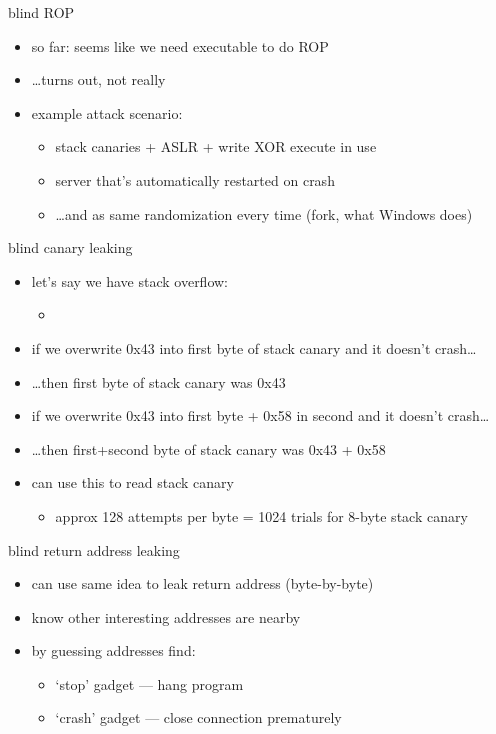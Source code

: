 \begin{frame}{blind ROP}
    \begin{itemize}
    \item so far: seems like we need executable to do ROP
    \item \ldots turns out, not really
    \vspace{.5cm}
    \item example attack scenario:
        \begin{itemize}
        \item stack canaries + ASLR + write XOR execute in use
        \item server that's automatically restarted on crash
        \item \ldots and as same randomization every time (fork, what Windows does)
        \end{itemize}
    \end{itemize}
\end{frame}

\begin{frame}{blind canary leaking}
    \begin{itemize}
    \item let's say we have stack overflow:
        \begin{itemize}
        \item [buffer we can overwrite][stack canary][return address]
        \end{itemize}
    \item if we overwrite 0x43 into first byte of stack canary and it doesn't crash\ldots
    \item \ldots then first byte of stack canary was 0x43
    \item if we overwrite 0x43 into first byte + 0x58 in second and it doesn't crash\ldots
    \item \ldots then first+second byte of stack canary was 0x43 + 0x58
    \item can use this to read stack canary
        \begin{itemize}
        \item approx 128 attempts per byte = 1024 trials for 8-byte stack canary
        \end{itemize}
    \end{itemize}
\end{frame}

\begin{frame}{blind return address leaking}
    \begin{itemize}
    \item can use same idea to leak return address (byte-by-byte)
    \item know other interesting addresses are nearby
    \vspace{.5cm}
    \item by guessing addresses find:
        \begin{itemize}
        \item `stop' gadget --- hang program
        \item `crash' gadget --- close connection prematurely
        \end{itemize}
    \end{itemize}
\end{frame}

